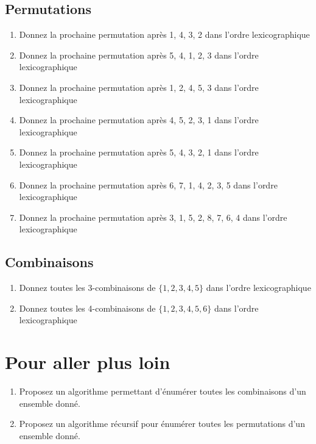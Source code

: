 \documentclass[a4paper,11pt]{article}
\begin{document}
\subsection{Permutations}

\begin{enumerate}
\item Donnez la prochaine permutation après 1, 4, 3, 2 dans l'ordre lexicographique

\item Donnez la prochaine permutation après 5, 4, 1, 2, 3 dans l'ordre lexicographique

\item Donnez la prochaine permutation après 1, 2, 4, 5, 3 dans l'ordre lexicographique

\item Donnez la prochaine permutation après 4, 5, 2, 3, 1 dans l'ordre lexicographique

\item Donnez la prochaine permutation après 5, 4, 3, 2, 1 dans l'ordre lexicographique

\item Donnez la prochaine permutation après 6, 7, 1, 4, 2, 3, 5 dans l'ordre lexicographique

\item Donnez la prochaine permutation après 3, 1, 5, 2, 8, 7, 6, 4 dans l'ordre lexicographique
\end{enumerate}

\subsection{Combinaisons}

\begin{enumerate}
\item Donnez toutes les 3-combinaisons de $\{1, 2, 3, 4, 5\}$ dans l'ordre lexicographique

\item Donnez toutes les 4-combinaisons de $\{1, 2, 3, 4, 5, 6\}$ dans l'ordre lexicographique
\end{enumerate}

\section{Pour aller plus loin}

\begin{enumerate}
\item Proposez un algorithme permettant d'énumérer toutes les combinaisons d'un ensemble donné.

\item Proposez un algorithme récursif pour énumérer toutes les permutations d'un ensemble donné.
\end{enumerate}
\end{document}
